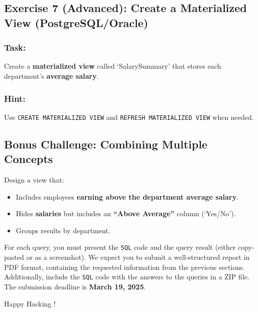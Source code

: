 \documentclass{article}
\begin{document}
\subsection*{Exercise 7 (Advanced): Create a Materialized View (PostgreSQL/Oracle)}
\subsubsection*{Task:}
Create a \textbf{materialized view} called `SalarySummary' that stores each department’s \textbf{average salary}.

\subsubsection*{Hint:}
Use \texttt{CREATE MATERIALIZED VIEW} and \texttt{REFRESH MATERIALIZED VIEW} when needed.

\subsection*{Bonus Challenge: Combining Multiple Concepts}
Design a view that:

\begin{itemize}
  \item Includes employees \textbf{earning above the department average salary}.
  \item Hides \textbf{salaries} but includes an \textbf{``Above Average''} column (`Yes/No').
  \item Groups results by department.
\end{itemize}

For each query, you must present the \texttt{SQL} code and the query result (either copy-pasted or as a screenshot). We expect you to submit a well-structured report in PDF format, containing the requested information from the previous sections. Additionally, include the \texttt{SQL} code with the answers to the queries in a ZIP file. The submission deadline is \textbf{March 19, 2025}.

\vspace{4mm}
Happy Hacking \smiley{}!
\end{document}
